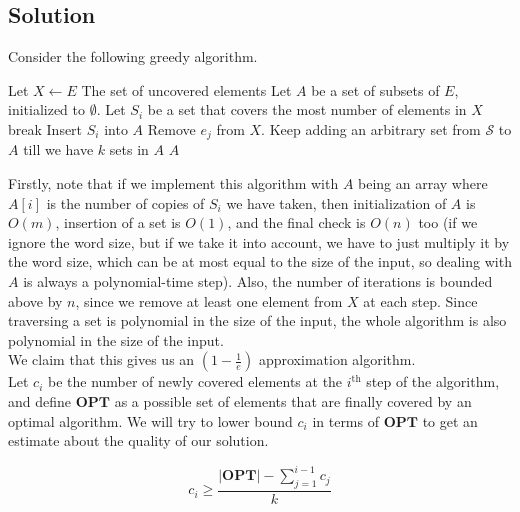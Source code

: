 \documentclass[a4paper]{article}
\newcommand{\nl}{\vspace{0.2cm}\\}
\newcommand{\OPT}{\mathbf{OPT}}
\begin{document}
\subsection{Solution}

Consider the following greedy algorithm.
\begin{algorithmic}[1]
        \State Let $X \gets E$ \Comment The set of uncovered elements
        \State Let $A$ be a set of subsets of $E$, initialized to $\emptyset$.
            \State Let $S_i$ be a set that covers the most number of elements in $X$
                \State break
            \EndIf
            \State Insert $S_i$ into $A$
                    \State Remove $e_j$ from $X$.
                \EndIf
            \EndFor
        \EndFor
            \State Keep adding an arbitrary set from $\mathcal{S}$ to $A$ till we have $k$ sets in $A$
        \EndIf
        \State \Return $A$
    \EndFunction
\end{algorithmic}
Firstly, note that if we implement this algorithm with $A$ being an array where $A[i]$ is the number of copies of $S_i$ we have taken, then initialization of $A$ is $O(m)$, insertion of a set is
$O(1)$, and the final check is $O(n)$ too (if we ignore the word size, but if we take it into account, we have to just multiply it by the word size, which can be at most equal to the size of the
input, so dealing with $A$ is always a polynomial-time step). Also, the number of iterations is bounded above by $n$, since we remove at least one element from $X$ at each step. Since
traversing a set is polynomial in the size of the input, the whole algorithm is also polynomial in the size of the input.\nl
We claim that this gives us an $\left(1 - \frac{1}{e}\right)$ approximation algorithm.\nl
Let $c_i$ be the number of newly covered elements at the $i^\mathrm{th}$ step of the algorithm, and define $\OPT$ as a possible set of elements that are finally covered by an optimal algorithm.
We will try to lower bound $c_i$ in terms of $\OPT$ to get an estimate about the quality of our solution. \nl

\begin{claim}
    $$c_i \ge \frac{|\OPT| - \sum_{j = 1}^{i - 1} c_j}{k}$$
\end{claim}
\end{document}
